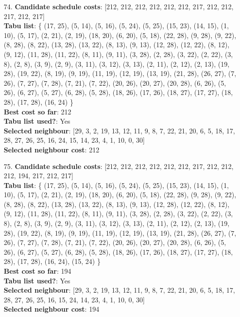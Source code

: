 \documentclass[fleqn]{article}
\begin{document}
\begin{itemize}
    \item[74.] \textbf{Candidate schedule costs}: [212, 212, 212, 212, 212, 212, 217, 212, 212, 217, 212, 217] \\
    \textbf{Tabu list}: \{ (17, 25), (5, 14), (5, 16), (5, 24), (5, 25), (15, 23), (14, 15), (1, 10), (5, 17), (2, 21), (2, 19), (18, 20), (6, 20), (5, 18), (22, 28), (9, 28), (9, 22), (8, 28), (8, 22), (13, 28), (13, 22), (8, 13), (9, 13), (12, 28), (12, 22), (8, 12), (9, 12), (11, 28), (11, 22), (8, 11), (9, 11), (3, 28), (2, 28), (3, 22), (2, 22), (3, 8), (2, 8), (3, 9), (2, 9), (3, 11), (3, 12), (3, 13), (2, 11), (2, 12), (2, 13), (19, 28), (19, 22), (8, 19), (9, 19), (11, 19), (12, 19), (13, 19), (21, 28), (26, 27), (7, 26), (7, 27), (7, 28), (7, 21), (7, 22), (20, 26), (20, 27), (20, 28), (6, 26), (5, 26), (6, 27), (5, 27), (6, 28), (5, 28), (18, 26), (17, 26), (18, 27), (17, 27), (18, 28), (17, 28), (16, 24) \} \\
    \textbf{Best cost so far}: 212 \\
    \textbf{Tabu list used?}: Yes \\
    \textbf{Selected neighbour}: [29, 3, 2, 19, 13, 12, 11, 9, 8, 7, 22, 21, 20, 6, 5, 18, 17, 28, 27, 26, 25, 16, 24, 15, 14, 23, 4, 1, 10, 0, 30] \\
    \textbf{Selected neighbour cost}: 212
      

    \item[75.] \textbf{Candidate schedule costs}: [212, 212, 212, 212, 212, 212, 217, 212, 212, 212, 194, 217, 212, 217] \\
    \textbf{Tabu list}: \{ (17, 25), (5, 14), (5, 16), (5, 24), (5, 25), (15, 23), (14, 15), (1, 10), (5, 17), (2, 21), (2, 19), (18, 20), (6, 20), (5, 18), (22, 28), (9, 28), (9, 22), (8, 28), (8, 22), (13, 28), (13, 22), (8, 13), (9, 13), (12, 28), (12, 22), (8, 12), (9, 12), (11, 28), (11, 22), (8, 11), (9, 11), (3, 28), (2, 28), (3, 22), (2, 22), (3, 8), (2, 8), (3, 9), (2, 9), (3, 11), (3, 12), (3, 13), (2, 11), (2, 12), (2, 13), (19, 28), (19, 22), (8, 19), (9, 19), (11, 19), (12, 19), (13, 19), (21, 28), (26, 27), (7, 26), (7, 27), (7, 28), (7, 21), (7, 22), (20, 26), (20, 27), (20, 28), (6, 26), (5, 26), (6, 27), (5, 27), (6, 28), (5, 28), (18, 26), (17, 26), (18, 27), (17, 27), (18, 28), (17, 28), (16, 24), (15, 24) \} \\
    \textbf{Best cost so far}: 194 \\
    \textbf{Tabu list used?}: Yes \\
    \textbf{Selected neighbour}: [29, 3, 2, 19, 13, 12, 11, 9, 8, 7, 22, 21, 20, 6, 5, 18, 17, 28, 27, 26, 25, 16, 15, 24, 14, 23, 4, 1, 10, 0, 30] \\
    \textbf{Selected neighbour cost}: 194
      


\end{itemize}
\end{document}
